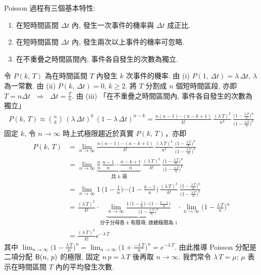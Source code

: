 \documentclass[12pt]{extarticle}
\newcommand{\ds}{\displaystyle}
\newcommand{\ie}{\;\Longrightarrow\;}
\theoremstyle{definition}
\begin{document}
\bigskip
\noindent Poisson 過程有三個基本特性: 
\begin{enumerate}[label=(\roman*)]\setlength{\itemsep}{0pt}
  \item 在短時間區間 $\Delta t$ 內, 發生一次事件的機率與 $\Delta t$ 成正比. 
  \item 在短時間區間 $\Delta t$ 內, 發生兩次以上事件的機率可忽略. 
  \item 在不重疊之時間區間內, 事件各自發生的次數為獨立. 
\end{enumerate}
令 $\ds P(k,\,T)$ 為在時間區間 $T$ 內發生 $k$ 次事件的機率. 由 (i) $\ds P(1,\,\Delta t) = \lambda\,\Delta t$, $\lambda$ 為一常數. 由 (ii) $\ds P(k,\,\Delta t) = 0$, $k\geqslant 2$. 將 $T$ 分割成 $n$ 個短時間區段, 亦即 $\ds T = n\Delta t$ $\ie$ $\Delta t = \frac{T}{n}$. 由 (iii) 「在不重疊之時間區間內, 事件各自發生的次數為獨立」 
\begin{align*}
  P(k,\,T) \approx \binom{n}{k}\,(\lambda\,\Delta t)^k\,(1 - \lambda\,\Delta t)^{n - k} = \frac{n(n - 1)\cdots(n - k + 1)}{k!}\,\frac{(\lambda\,T)^k}{n^k}\,\frac{\big(1 - \frac{\lambda\,T}{n}\big)^n}{\big(1 - \frac{\lambda\,T}{n}\big)^k}
\end{align*}
固定 $k$, 令 $n\to\infty$ 時上式極限趨近於真實 $\ds P(k,\,T)$，亦即
\begin{align*}
  P(k,\,T) &= \lim_{n\to\infty}\frac{n(n - 1)\cdots(n - k + 1)}{k!}\,\frac{(\lambda\,T)^k}{n^k}\,\frac{\big(1 - \frac{\lambda\,T}{n}\big)^n}{\big(1 - \frac{\lambda\,T}{n}\big)^k} \\
  &= \lim_{n\to\infty}\underbrace{\frac{n}{n}\,\frac{n - 1}{n}\cdots\frac{n - k + 1}{n}}_{\text{共 $k$ 項}}\,\frac{(\lambda\,T)^k}{k!}\,\frac{\big(1 - \frac{\lambda\,T}{n}\big)^n}{\big(1 - \frac{\lambda\,T}{n}\big)^k} \\
  &= \lim_{n\to\infty}1\,\Big(1 - \frac{1}{n}\Big)\cdots\Big(1 - \frac{k - 1}{n}\Big)\,\frac{(\lambda\,T)^k}{k!}\,\frac{\big(1 - \frac{\lambda\,T}{n}\big)^n}{\big(1 - \frac{\lambda\,T}{n}\big)^k} \\ 
  &= \frac{(\lambda\,T)^k}{k!}\cdot\underbrace{\lim_{n\to\infty}\frac{1\,\big(1 - \frac{1}{n}\big)\cdots\big(1 - \frac{k - 1}{n}\big)}{\big(1 - \frac{\lambda\,T}{n}\big)^k}}_{\text{分子分母各 $k$ 有限項, 故總極限為 $1$}}\cdot\lim_{n\to\infty}\Big(1 - \frac{\lambda\,T}{n}\Big)^n\\ 
  &=\frac{(\lambda\,T)^k}{k!}e^{-\lambda\,T}
\end{align*}
其中 $\ds\lim_{n\to\infty}\Big(1 - \frac{\lambda\,T}{n}\Big)^n = \lim_{n\to\infty}\Big(1 + \frac{-\lambda\,T}{n}\Big)^n = e^{-\lambda\,T}$. 由此推導 Poisson 分配是二項分配 ${\sf B}(n,\,p)$ 的極限, 固定 $n\,p = \lambda\,T$ 後再取 $n\to\infty$. 我們常令 $\lambda\,T = \mu$; $\mu$ 表示在時間區間 $T$ 內的平均發生次數. 
\end{document}
